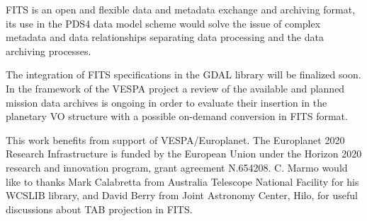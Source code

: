 FITS is an open and flexible data and metadata exchange and archiving format, its use
in the PDS4 data model scheme would solve the issue of complex
metadata and data relationships separating data processing and the data archiving processes.

The integration of FITS specifications in the GDAL library will be finalized soon.
In the framework of the VESPA project a review of the available and planned mission data
archives is ongoing in order to evaluate their insertion in the planetary VO structure
with a possible on-demand conversion in FITS format.


%
%
%
%

%

%

%

\acknowledgments
This work benefits from support of VESPA/Europlanet.
The Europlanet 2020 Research Infrastructure is funded by the European Union
under the Horizon 2020 research and innovation program, grant agreement N.654208.
C. Marmo would like to thanks Mark Calabretta from Australia Telescope National Facility
for his WCSLIB library, and David Berry from Joint Astronomy Center, Hilo, for useful
discussions about TAB projection in FITS.

